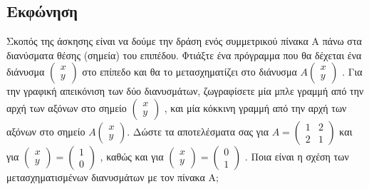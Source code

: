 \documentclass[a4paper,12pt]{article}
\begin{document}
\subsection{Εκφώνηση}
Σκοπός της άσκησης είναι να δούμε την δράση ενός συμμετρικού πίνακα Α πάνω στα διανύσματα θέσης (σημεία) του
επιπέδου. Φτιάξτε ένα πρόγραμμα που θα δέχεται ένα διάνυσμα
$
	\begin{pmatrix}
		x \\
		y
	\end{pmatrix}
$
στο επίπεδο και θα το μετασχηματίζει στο διάνυσμα
$
	A
	\begin{pmatrix}
		x \\
		y
	\end{pmatrix}
$
. Για την γραφική απεικόνιση των δύο διανυσμάτων, ζωγραφίσετε μία μπλε γραμμή από την αρχή των αξόνων
στο σημείο
$
	\begin{pmatrix}
		x \\
		y
	\end{pmatrix}
$
, και μία κόκκινη γραμμή από την αρχή των αξόνων στο σημείο
$
	A
	\begin{pmatrix}
		x \\
		y
	\end{pmatrix}
$. Δώστε τα αποτελέσματα σας για
$
	A=\begin{pmatrix}
		1 & 2 \\
		2 & 1
	\end{pmatrix}
$
και για
$
	\begin{pmatrix}
		x \\
		y
	\end{pmatrix}=\begin{pmatrix}
		1 \\
		0
	\end{pmatrix}
$
, καθώς και για
$
	\begin{pmatrix}
		x \\
		y
	\end{pmatrix}=\begin{pmatrix}
		0 \\
		1
	\end{pmatrix}
$
. Ποια είναι η σχέση των μετασχηματισμένων διανυσμάτων με τον πίνακα Α;
\end{document}
